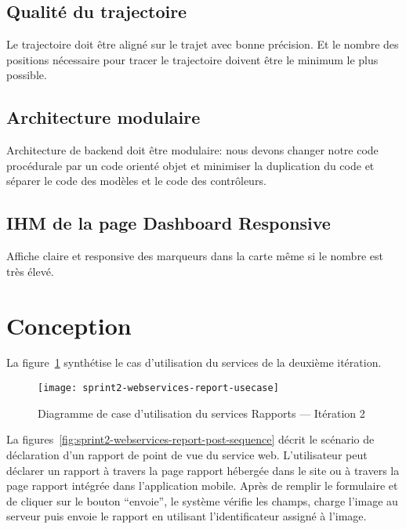 \subsection{Qualité du trajectoire}

Le trajectoire doit être aligné sur le trajet avec bonne précision. Et le
nombre des positions nécessaire pour tracer le trajectoire doivent être le
minimum le plus possible.

\subsection{Architecture modulaire}

Architecture de backend doit être modulaire: nous devons changer notre code
procédurale par un code orienté objet et minimiser la duplication du code et
séparer le code des modèles et le code des contrôleurs.

\subsection{IHM de la page Dashboard Responsive}

Affiche claire et responsive des marqueurs dans la carte même si le nombre est
très élevé.

\section{Conception}

La figure~\ref{fig:sprint2-webservices-report-usecase} synthétise le cas
d'utilisation du services  de la deuxième itération.

\begin{figure}[H]
    \centering
    \texttt{[image: sprint2-webservices-report-usecase]}
    \caption{Diagramme de case d'utilisation du services Rapports --- Itération 2}
\label{fig:sprint2-webservices-report-usecase}
\end{figure}

La figures~\ref{fig:sprint2-webservices-report-post-sequence} décrit le
scénario de déclaration d'un rapport de point de vue du service web.
L'utilisateur peut déclarer un rapport à travers la page rapport hébergée dans
le site ou à travers la page rapport intégrée dans l'application mobile. Après
de remplir le formulaire et de cliquer sur le bouton ``envoie'', le système
vérifie les champs, charge l'image au serveur puis envoie le rapport en
utilisant l'identificateur assigné à l'image.


